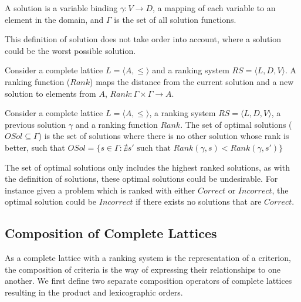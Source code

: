\begin{defs}
A solution is a variable binding $\gamma: V \rightarrow D$, a mapping of each variable to an element in the domain,
and $\Gamma$ is the set of all solution functions.
\end{defs}

This definition of solution does not take order into account, where a solution could be the worst possible solution.

\begin{defs}
Consider a complete lattice $L = \langle A, \leq \rangle$ and a ranking system $RS = \langle L, D, V \rangle$.
A ranking function ($Rank$) maps the distance from the current solution and a new solution to elements from $A$,
$Rank: \Gamma \times \Gamma \rightarrow A$.
\end{defs}

\begin{defs}
Consider a complete lattice $L = \langle A, \leq \rangle$, a ranking system $RS = \langle L, D, V \rangle$, a previous solution $\gamma$ and a ranking function $Rank$.
The set of optimal solutions ($OSol \subseteq \Gamma$) is the set of solutions where there is no other solution whose rank is better,
such that $OSol = \{ s \in \Gamma : \nexists s' \mbox{ such that } Rank(\gamma,s) < Rank(\gamma,s')\}$
\end{defs}

The set of optimal solutions only includes the highest ranked solutions,
as with the definition of solutions, these optimal solutions could be undesirable.
For instance given a problem which is ranked with either $Correct$ or $Incorrect$, 
the optimal solution could be $Incorrect$ if there exists no solutions that are $Correct$. 

\subsection{Composition of Complete Lattices}
\label{sec:composition}
As a complete lattice with a ranking system is the representation of a criterion,
the composition of criteria is the way of expressing their relationships to one another. 
We first define two separate composition operators of complete lattices resulting in the product and lexicographic orders.

